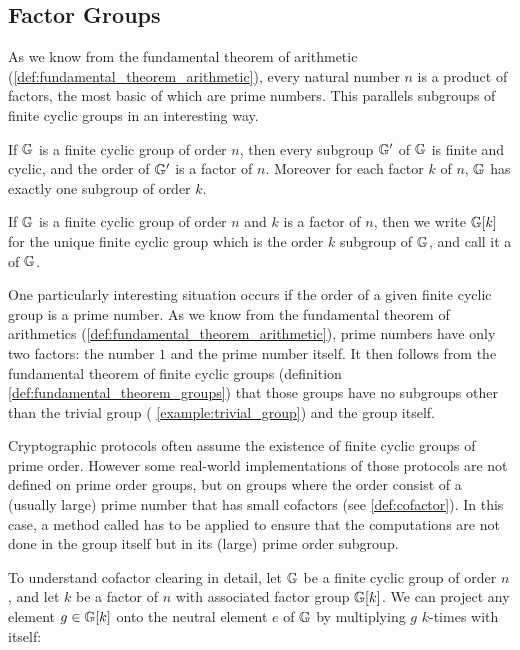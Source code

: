 \subsection{Factor Groups}
As we know from the fundamental theorem of arithmetic (\ref{def:fundamental_theorem_arithmetic}), every natural number $n$ is a product of factors, the most basic of which are prime numbers. This parallels subgroups of finite cyclic groups in an interesting way.

\begin{definition}\label{def:fundamental_theorem_groups}
If $\mathbb{G}$ is a finite cyclic group of order $n$, then every subgroup $\mathbb{G}'$ of $\mathbb{G}$ is finite and cyclic, and the order of $\mathbb{G}'$ is a factor of $n$. Moreover for each factor $k$ of $n$, $\mathbb{G}$ has exactly one subgroup of order $k$.
\end{definition}

\begin{notation}If $\mathbb{G}$ is a finite cyclic group of order $n$ and $k$ is a factor of $n$, then we write $\mathbb{G}[k]$ for the unique finite cyclic group which is the order $k$ subgroup of $\mathbb{G}$, and call it a  of $\mathbb{G}$.
\end{notation}

One particularly interesting situation occurs if the order of a given finite cyclic group is a prime number. As we know from the fundamental theorem of arithmetics (\ref{def:fundamental_theorem_arithmetic}), prime numbers have only two factors: the number $1$ and the prime number itself. It then follows from the fundamental theorem of finite cyclic groups (definition \ref{def:fundamental_theorem_groups}) that those groups have no subgroups other than the trivial group (\examplename{} \ref{example:trivial_group}) and the group itself.

Cryptographic protocols often assume the existence of finite cyclic groups of prime order. However  some real-world implementations of those protocols are not defined on prime order groups, but on groups where the order consist of a (usually large) prime number that has small cofactors (see \notationname{} \ref{def:cofactor}). In this case, a method called  has to be applied to ensure that the computations are not done in the group itself but in its (large) prime order subgroup.

To understand cofactor clearing in detail, let $\mathbb{G}$ be a finite cyclic group of order $n$, and let $k$ be a factor of $n$ with associated factor group $\mathbb{G}[k]$. We can project any element $g\in\mathbb{G}[k]$ onto the neutral element $e$ of $\mathbb{G}$ by multiplying $g$ $k$-times with itself:


